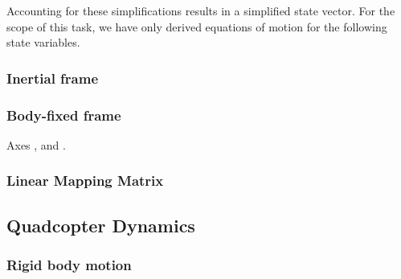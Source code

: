 Accounting for these simplifications results in a simplified state vector. For the scope of this task, we have only derived equations of motion for the following state variables.
\subsubsection[Inertial frame]{Inertial frame } %
\subsubsection[Body-fixed frame]{Body-fixed frame }
Axes ,  and .
\subsubsection[Linear Mapping Matrix]{Linear Mapping Matrix }
\label{sss:lmapmatQ}

\subsection{Quadcopter Dynamics}
\subsubsection{Rigid body motion}
\label{rigid-body-motion}